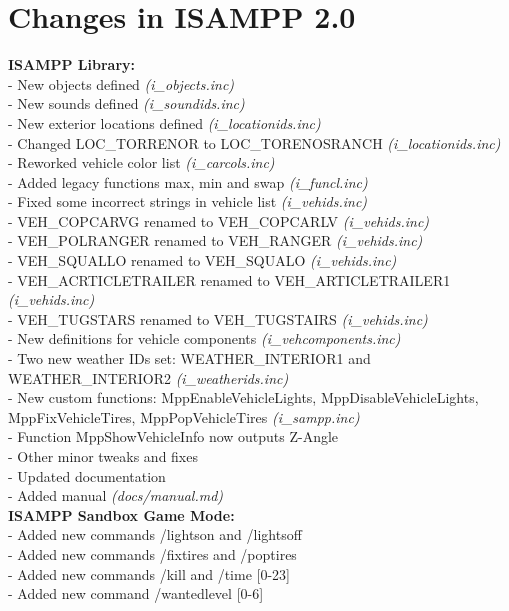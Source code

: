\documentclass{article}
\begin{document}
\section{Changes in ISAMPP 2.0}
\textbf{ISAMPP Library:}
\\- New objects defined \textit{(i\_objects.inc)}
\\- New sounds defined \textit{(i\_soundids.inc)}
\\- New exterior locations defined \textit{(i\_locationids.inc)}
\\- Changed LOC\_TORRENOR to LOC\_TORENOSRANCH \textit{(i\_locationids.inc)}
\\- Reworked vehicle color list \textit{(i\_carcols.inc)}
\\- Added legacy functions max, min and swap \textit{(i\_funcl.inc)}
\\- Fixed some incorrect strings in vehicle list \textit{(i\_vehids.inc)}
\\- VEH\_COPCARVG renamed to VEH\_COPCARLV \textit{(i\_vehids.inc)}
\\- VEH\_POLRANGER renamed to VEH\_RANGER \textit{(i\_vehids.inc)}
\\- VEH\_SQUALLO renamed to VEH\_SQUALO \textit{(i\_vehids.inc)}
\\- VEH\_ACRTICLETRAILER renamed to VEH\_ARTICLETRAILER1 \textit{(i\_vehids.inc)}
\\- VEH\_TUGSTARS renamed to VEH\_TUGSTAIRS \textit{(i\_vehids.inc)}
\\- New definitions for vehicle components \textit{(i\_vehcomponents.inc)}
\\- Two new weather IDs set: WEATHER\_INTERIOR1 and WEATHER\_INTERIOR2 \textit{(i\_weatherids.inc)}
\\- New custom functions: MppEnableVehicleLights, MppDisableVehicleLights, MppFixVehicleTires, MppPopVehicleTires \textit{(i\_sampp.inc)}
\\- Function MppShowVehicleInfo now outputs Z-Angle
\\- Other minor tweaks and fixes
\\- Updated documentation
\\- Added manual \textit{(docs/manual.md)}
\bigskip
\\\textbf{ISAMPP Sandbox Game Mode:}
\\- Added new commands /lightson and /lightsoff
\\- Added new commands /fixtires and /poptires
\\- Added new commands /kill and /time [0-23]
\\- Added new command /wantedlevel [0-6]
\end{document}
